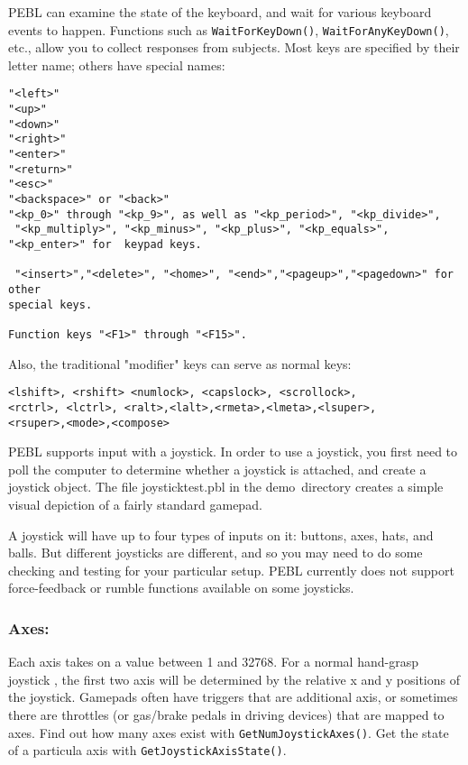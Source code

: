 
PEBL can examine the state of the keyboard, and wait for various
keyboard events to happen. Functions such as
\texttt{WaitForKeyDown()}, \texttt{WaitForAnyKeyDown()}, etc., allow
you to collect responses from subjects. Most keys are specified by
their letter name; others have special names:
\begin{verbatim}
"<left>"
"<up>"
"<down>"
"<right>"
"<enter>"
"<return>"
"<esc>"
"<backspace>" or "<back>"
"<kp_0>" through "<kp_9>", as well as "<kp_period>", "<kp_divide>",
 "<kp_multiply>", "<kp_minus>", "<kp_plus>", "<kp_equals>",
"<kp_enter>" for  keypad keys.

 "<insert>","<delete>", "<home>", "<end>","<pageup>","<pagedown>" for other
special keys.

Function keys "<F1>" through "<F15>".
\end{verbatim}

Also, the traditional "modifier" keys can serve as normal keys:


\begin{verbatim}
<lshift>, <rshift> <numlock>, <capslock>, <scrollock>, 
<rctrl>, <lctrl>, <ralt>,<lalt>,<rmeta>,<lmeta>,<lsuper>,
<rsuper>,<mode>,<compose>

\end{verbatim}


PEBL supports input with a joystick. In order to use a joystick, you first need to poll the computer to determine whether a joystick is attached, and create a joystick object.  The file joysticktest.pbl in the demo\ directory creates a simple visual depiction of a fairly standard gamepad.


A joystick will have up to four types of inputs on it: buttons, axes, hats, and balls.  But different joysticks are different, and so you may need to do some checking and testing for your particular setup.  PEBL currently does not support force-feedback or rumble functions available on some joysticks.

\subsubsection{Axes:} 
Each axis takes on a value between 1 and 32768. For a  normal hand-grasp joystick , the first two axis will be determined by the relative x and y positions of the joystick.  Gamepads often have triggers that are additional axis, or sometimes there are throttles (or gas/brake pedals in driving devices) that are mapped to axes.
Find out how many axes exist with \texttt{GetNumJoystickAxes()}.  Get the state of a particula axis with \texttt{GetJoystickAxisState()}.  


